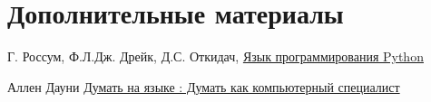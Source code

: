 % 
% 
% 
% 
% 
% 
% 
% 
% 
% 
% 
% 
% 
% 
% 
% 
% 
% 
% 
% 
% 
% 
% 
% 
% 
% 

\section{Дополнительные материалы}

\cite{pyotkidach} Г. Россум, Ф.Л.Дж. Дрейк, Д.С. Откидач,
\href{http://rus-linux.net/MyLDP/BOOKS/python.pdf}{Язык программирования Python}

\cite{pythink} Аллен Дауни
\href{https://drive.google.com/file/d/0B0u4WeMjO894Q2hWV1QwOFFQOVk/view?usp=sharing}{Думать
на языке \py: Думать как компьютерный специалист}

